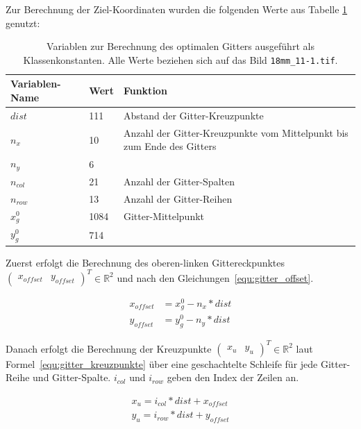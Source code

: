 Zur Berechnung der Ziel-Koordinaten wurden die folgenden Werte aus Tabelle \ref{tab:gitter_koordinaten_variablen} genutzt:

\begin{table}
\centering
\begin{tabular}{|l|l|p{}|}
\toprule
Variablen-Name & Wert & Funktion\\
\midrule
$dist$ & 111 & Abstand der Gitter-Kreuzpunkte\\
\midrule
$n_x$ & 10 & Anzahl der Gitter-Kreuzpunkte vom Mittelpunkt bis zum Ende des Gitters\\
$n_y$ & 6 & \\
\midrule
$n_{col}$ & 21 & Anzahl der Gitter-Spalten\\
$n_{row}$ & 13 & Anzahl der Gitter-Reihen\\
\midrule
$x_g^0$ & 1084 & Gitter-Mittelpunkt \\
$y_g^0$ & 714 & \\
\bottomrule
\end{tabular}
\caption{Variablen zur Berechnung des optimalen Gitters ausgeführt als Klassenkonstanten. Alle Werte beziehen sich auf das Bild \texttt{18mm\_11-1.tif}. }
\label{tab:gitter_koordinaten_variablen}
\end{table}

Zuerst erfolgt die Berechnung des oberen-linken Gittereckpunktes $\begin{pmatrix}
x_{offset} & y_{offset}\end{pmatrix}^T \in \mathbb{R}^2$ und nach den Gleichungen~\ref{equ:gitter_offset}. 

\begin{equation}
\label{equ:gitter_offset}
\begin{aligned}
x_{offset} &= x_g^0 - n_x * dist\\
y_{offset} &= y_g^0 - n_y * dist
\end{aligned}
\end{equation}

Danach erfolgt die Berechnung der Kreuzpunkte $\begin{pmatrix}x_{u} & y_{u}\end{pmatrix}^T \in \mathbb{R}^2$ laut Formel~\ref{equ:gitter_kreuzpunkte} über eine geschachtelte Schleife für jede Gitter-Reihe und Gitter-Spalte. $i_{col}$ und $i_{row}$ geben den Index der Zeilen an.

\begin{equation}
\label{equ:gitter_kreuzpunkte}
\begin{split}
x_{u} = i_{col} * dist + x_{offset}\\
y_{u} = i_{row} * dist + y_{offset}
\end{split}
\end{equation}

